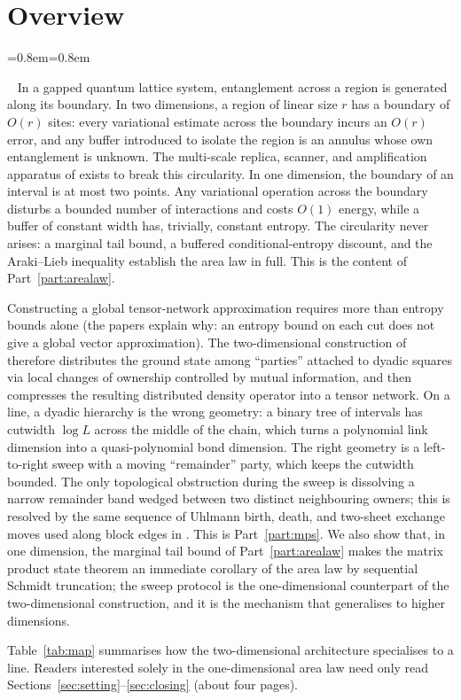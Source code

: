 \documentclass[aps,prx,reprint,superscriptaddress,floatfix,nofootinbib,longbibliography,amsmath,amssymb]{revtex4-2}
\theoremstyle{plain}
\theoremstyle{definition}
\newenvironment{inwords}{%
  \par\medskip\noindent
  \begin{list}{}{\leftmargin=0.8em\rightmargin=0.8em}
  \item\relax
  \noindent{\sffamily\bfseries\color{blue!40!black}In words.}\ \sffamily\small}{%
  \end{list}\par\medskip}
\begin{document}
\section{Overview}

\begin{inwords}
In a gapped quantum lattice system, entanglement across a region is
generated along its boundary. In two dimensions, a region of linear size
$r$ has a boundary of $O(r)$ sites: every variational estimate across the
boundary incurs an $O(r)$ error, and any buffer introduced to isolate the
region is an annulus whose own entanglement is unknown. The multi-scale
replica, scanner, and amplification apparatus of \cite{AL} exists to
break this circularity. In one dimension, the boundary of an interval is at
most two points. Any variational operation across the boundary disturbs a
bounded number of interactions and costs $O(1)$ energy, while a buffer of
constant width has, trivially, constant entropy. The circularity never arises: a marginal tail bound,
a buffered conditional-entropy discount, and the Araki--Lieb inequality
establish the area law in full. This is the content of
Part~\ref{part:arealaw}.

Constructing a global tensor-network approximation requires more than
entropy bounds alone (the papers explain why: an entropy bound on each cut
does not give a global vector approximation).
The two-dimensional construction of \cite{PP} therefore distributes the
ground state among ``parties'' attached to dyadic squares via local
changes of ownership controlled by mutual information, and then compresses
the resulting distributed density operator into a tensor network. On a
line, a dyadic hierarchy is the wrong geometry: a binary tree of intervals
has cutwidth $\log L$ across the middle of the chain, which turns a
polynomial link dimension into a quasi-polynomial bond dimension. The
right geometry is a left-to-right sweep with a moving ``remainder'' party,
which keeps the cutwidth bounded. The only topological obstruction during
the sweep is dissolving a narrow remainder band wedged between two
distinct neighbouring owners; this is resolved by the same sequence of
Uhlmann birth, death, and two-sheet exchange moves used along block edges
in \cite{PP}. This is Part~\ref{part:mps}. We also show that, in one
dimension, the marginal tail bound of Part~\ref{part:arealaw} makes the
matrix product state theorem an immediate corollary of the area law by
sequential Schmidt truncation; the sweep protocol is the one-dimensional
counterpart of the two-dimensional construction, and it is the mechanism
that generalises to higher dimensions.

Table~\ref{tab:map} summarises how the two-dimensional architecture
specialises to a line. Readers interested solely in the one-dimensional
area law need only read Sections~\ref{sec:setting}--\ref{sec:closing}
(about four pages).
\end{inwords}
\end{document}

